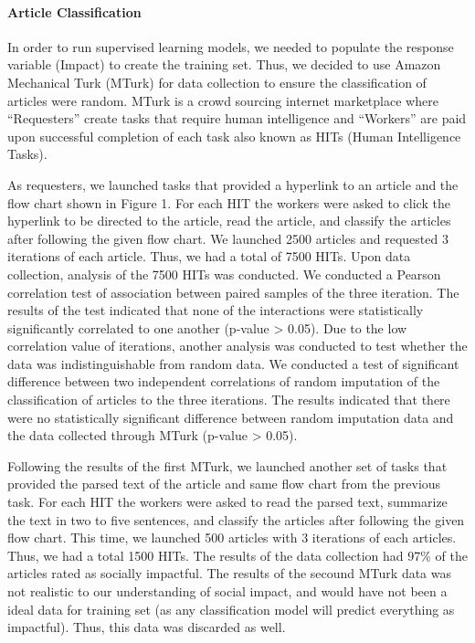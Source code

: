 \documentclass[10pt,letterpaper]{article}
\begin{document}
\paragraph{Article Classification}\label{article-classification}

In order to run supervised learning models, we needed to populate the
response variable (Impact) to create the training set. Thus, we decided
to use Amazon Mechanical Turk (MTurk) for data collection to ensure the
classification of articles were random. MTurk is a crowd sourcing
internet marketplace where ``Requesters'' create tasks that require
human intelligence and ``Workers'' are paid upon successful completion
of each task also known as HITs (Human Intelligence Tasks).

As requesters, we launched tasks that provided a hyperlink to an article
and the flow chart shown in Figure 1. For each HIT the workers were
asked to click the hyperlink to be directed to the article, read the
article, and classify the articles after following the given flow chart.
We launched 2500 articles and requested 3 iterations of each article.
Thus, we had a total of 7500 HITs. Upon data collection, analysis of the
7500 HITs was conducted. We conducted a Pearson correlation test of
association between paired samples of the three iteration. The results
of the test indicated that none of the interactions were statistically
significantly correlated to one another (p-value \textgreater{} 0.05).
Due to the low correlation value of iterations, another analysis was
conducted to test whether the data was indistinguishable from random
data. We conducted a test of significant difference between two
independent correlations of random imputation of the classification of
articles to the three iterations. The results indicated that there were
no statistically significant difference between random imputation data
and the data collected through MTurk (p-value \textgreater{} 0.05).

Following the results of the first MTurk, we launched another set of
tasks that provided the parsed text of the article and same flow chart
from the previous task. For each HIT the workers were asked to read the
parsed text, summarize the text in two to five sentences, and classify
the articles after following the given flow chart. This time, we
launched 500 articles with 3 iterations of each articles. Thus, we had a
total 1500 HITs. The results of the data collection had 97\% of the
articles rated as socially impactful. The results of the secound MTurk
data was not realistic to our understanding of social impact, and would
have not been a ideal data for training set (as any classification model
will predict everything as impactful). Thus, this data was discarded as
well.
\end{document}
